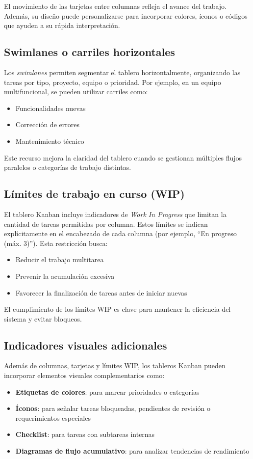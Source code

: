 El movimiento de las tarjetas entre columnas refleja el avance del trabajo. Además, su diseño puede personalizarse para incorporar colores, íconos o códigos que ayuden a su rápida interpretación.

\subsection{Swimlanes o carriles horizontales}

Los \textit{swimlanes} permiten segmentar el tablero horizontalmente, organizando las tareas por tipo, proyecto, equipo o prioridad. Por ejemplo, en un equipo multifuncional, se pueden utilizar carriles como:
\begin{itemize}
    \item Funcionalidades nuevas
    \item Corrección de errores
    \item Mantenimiento técnico
\end{itemize}

Este recurso mejora la claridad del tablero cuando se gestionan múltiples flujos paralelos o categorías de trabajo distintas.

\subsection{Límites de trabajo en curso (WIP)}

El tablero Kanban incluye indicadores de \textit{Work In Progress} que limitan la cantidad de tareas permitidas por columna. Estos límites se indican explícitamente en el encabezado de cada columna (por ejemplo, ``En progreso (máx. 3)''). Esta restricción busca:
\begin{itemize}
    \item Reducir el trabajo multitarea
    \item Prevenir la acumulación excesiva
    \item Favorecer la finalización de tareas antes de iniciar nuevas
\end{itemize}

El cumplimiento de los límites WIP es clave para mantener la eficiencia del sistema y evitar bloqueos.

\subsection{Indicadores visuales adicionales}

Además de columnas, tarjetas y límites WIP, los tableros Kanban pueden incorporar elementos visuales complementarios como:
\begin{itemize}
    \item \textbf{Etiquetas de colores}: para marcar prioridades o categorías
    \item \textbf{Íconos}: para señalar tareas bloqueadas, pendientes de revisión o requerimientos especiales
    \item \textbf{Checklist}: para tareas con subtareas internas
    \item \textbf{Diagramas de flujo acumulativo}: para analizar tendencias de rendimiento
\end{itemize}

